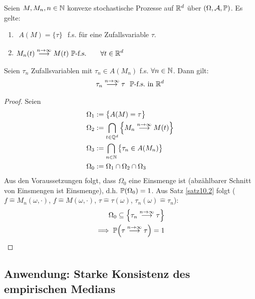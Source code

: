 \begin{satz}\label{satz10.3}
	Seien $M,M_n,n\in\N$ konvexe stochastische Prozesse auf $\R^d$ über $(\Omega,\A,\P)$.
	Es gelte:
	\begin{enumerate}[label=(\arabic*)]
		\item $\begin{aligned}
			A(M)=\lbrace\tau\rbrace
		\end{aligned}$ f.s. für eine Zufallsvariable $\tau$.
		\item $\begin{aligned}
			M_n(t)\overset{n\to\infty}{\longrightarrow} M(t)~\P\text{-f.s.}\qquad\forall t\in\R^d
		\end{aligned}$
	\end{enumerate}
	Seien $\tau_n$ Zufallsvariablen mit $\tau_n\in A(M_n)$ f.s. $\forall n\in\N$.
	Dann gilt:
	\begin{align*}
		\tau_n\overset{n\to\infty}{\longrightarrow}\tau~~\P\text{-f.s.}\text{ in }\R^d
	\end{align*}
\end{satz}

\begin{proof}
	Seien
	\begin{align*}
		\Omega_1&:=\big\lbrace A(M)=\tau\big\rbrace\\
		\Omega_2&:=\bigcap\limits_{t\in\Q^d}\Big\lbrace M_n\overset{n\to\infty}{\longrightarrow}M(t)\Big\rbrace\\
		\Omega_3&:=\bigcap\limits_{n\in\N}\big\lbrace\tau_n\in A(M_n)\big\rbrace\\
		\Omega_0&:=\Omega_1\cap\Omega_2\cap\Omega_3
	\end{align*}
	Aus den Voraussetzungen folgt, dass $\Omega_0$ eine Einsmenge ist (abzählbarer Schnitt von Einsmengen ist Einsmenge), d.h. $\P(\Omega_0)=1$.
	Aus Satz \ref{satz10.2} folgt ($f\hat{=}M_n(\omega,\cdot)$, $f\hat{=}M(\omega,\cdot)$, $\tau\hat{=}\tau(\omega)$, $\tau_n(\omega)\hat{=}\tau_n$):
	\begin{align*}
		\Omega_0\subseteq\Big\lbrace\tau_n\overset{n\to\infty}{\longrightarrow}\tau\Big\rbrace\\
		\implies \P\Big(\tau\overset{n\to\infty}{\longrightarrow}\tau\Big)=1
	\end{align*}
\end{proof}

\subsection{Anwendung: Starke Konsistenz des empirischen Medians} %

